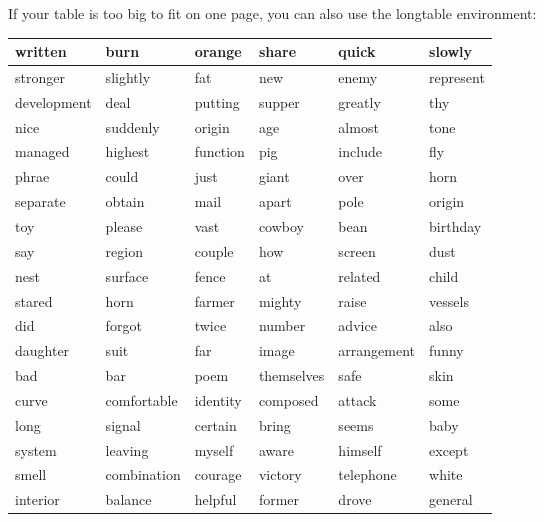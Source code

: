 \documentclass{jcls}
\begin{document}
If your table is too big to fit on one page, you can also use the longtable environment:

\begin{fullwidth}
	\begin{longtable}{@{}llllll@{}}
		\toprule
		written     & burn        & orange   & share      & quick       & slowly    \\* \midrule
		\endhead
		\endfoot
		\endlastfoot
		stronger    & slightly    & fat      & new        & enemy       & represent \\
		development & deal        & putting  & supper     & greatly     & thy       \\
		nice        & suddenly    & origin   & age        & almost      & tone      \\
		managed     & highest     & function & pig        & include     & fly       \\
		phrae       & could       & just     & giant      & over        & horn      \\
		separate    & obtain      & mail     & apart      & pole        & origin    \\
		toy         & please      & vast     & cowboy     & bean        & birthday  \\
		say         & region      & couple   & how        & screen      & dust      \\
		nest        & surface     & fence    & at         & related     & child     \\
		stared      & horn        & farmer   & mighty     & raise       & vessels   \\
		did         & forgot      & twice    & number     & advice      & also      \\
		daughter    & suit        & far      & image      & arrangement & funny     \\
		bad         & bar         & poem     & themselves & safe        & skin      \\
		curve       & comfortable & identity & composed   & attack      & some      \\
		long        & signal      & certain  & bring      & seems       & baby      \\
		system      & leaving     & myself   & aware      & himself     & except    \\
		smell       & combination & courage  & victory    & telephone   & white     \\
		interior    & balance     & helpful  & former     & drove       & general   \\

\end{longtable}
\end{fullwidth}
\end{document}
